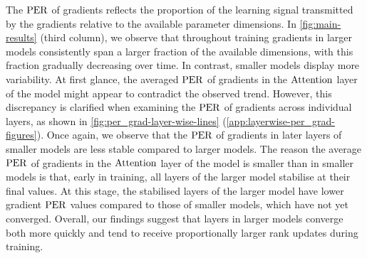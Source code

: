 \begin{result}
\label{result}
The $\mathrm{PER}$ of gradients reflects the proportion of the learning signal transmitted by the gradients relative to the available parameter dimensions. In \cref{fig:main-results} (third column), we observe that throughout training gradients in larger models consistently span a larger fraction of the available dimensions, with this fraction gradually decreasing over time. In contrast, smaller models display more variability. At first glance, the averaged $\mathrm{PER}$ of gradients in the $\mathrm{Attention}$ layer of the \twobil model might appear to contradict the observed trend. However, this discrepancy is clarified when examining the $\mathrm{PER}$ of gradients across individual layers, as shown in \cref{fig:per_grad-layer-wise-lines} (\cref{app:layerwise-per_grad-figures}). Once again, we observe that the $\mathrm{PER}$ of gradients in later layers of smaller models are less stable compared to larger models. The reason the average $\mathrm{PER}$ of gradients in the $\mathrm{Attention}$ layer of the \twobil model is smaller than in smaller models is that, early in training, all layers of the larger model stabilise at their final values. At this stage, the stabilised layers of the larger model have lower gradient $\mathrm{PER}$ values compared to those of smaller models, which have not yet converged. Overall, our findings suggest that layers in larger models converge both more quickly and tend to receive proportionally larger rank updates during training.
\end{result}

